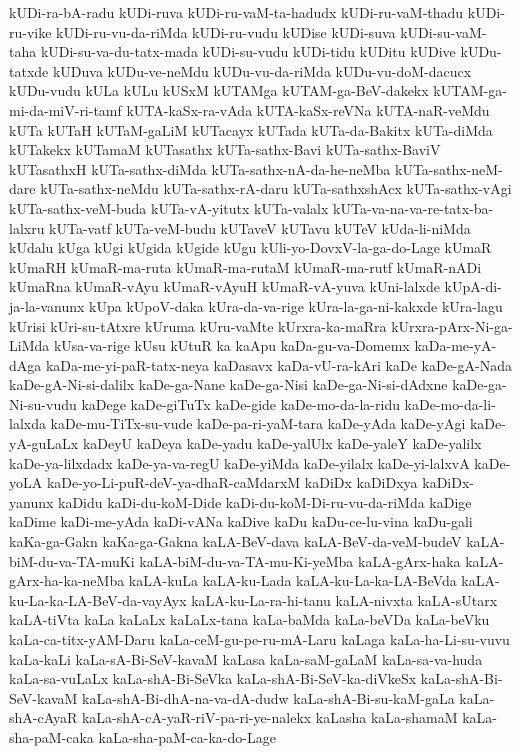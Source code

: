 {kUDi-ra-bA-radu
kUDi-ruva
kUDi-ru-vaM-ta-hadudx
kUDi-ru-vaM-thadu
kUDi-ru-vike
kUDi-ru-vu-da-riMda
kUDi-ru-vudu
kUDise
kUDi-suva
kUDi-su-vaM-taha
kUDi-su-va-du-tatx-mada
kUDi-su-vudu
kUDi-tidu
kUDitu
kUDive
kUDu-tatxde
kUDuva
kUDu-ve-neMdu
kUDu-vu-da-riMda
kUDu-vu-doM-dacucx
kUDu-vudu
kULa
kULu
kUSxM
kUTAMga
kUTAM-ga-BeV-dakekx
kUTAM-ga-mi-da-miV-ri-tamf
kUTA-kaSx-ra-vAda
kUTA-kaSx-reVNa
kUTA-naR-veMdu
kUTa
kUTaH
kUTaM-gaLiM
kUTacayx
kUTada
kUTa-da-Bakitx
kUTa-diMda
kUTakekx
kUTamaM
kUTasathx
kUTa-sathx-Bavi
kUTa-sathx-BaviV
kUTasathxH
kUTa-sathx-diMda
kUTa-sathx-nA-da-he-neMba
kUTa-sathx-neM-dare
kUTa-sathx-neMdu
kUTa-sathx-rA-daru
kUTa-sathxshAcx
kUTa-sathx-vAgi
kUTa-sathx-veM-buda
kUTa-vA-yitutx
kUTa-valalx
kUTa-va-na-va-re-tatx-ba-lalxru
kUTa-vatf
kUTa-veM-budu
kUTaveV
kUTavu
kUTeV
kUda-li-niMda
kUdalu
kUga
kUgi
kUgida
kUgide
kUgu
kUli-yo-DovxV-la-ga-do-Lage
kUmaR
kUmaRH
kUmaR-ma-ruta
kUmaR-ma-rutaM
kUmaR-ma-rutf
kUmaR-nADi
kUmaRna
kUmaR-vAyu
kUmaR-vAyuH
kUmaR-vA-yuva
kUni-lalxde
kUpA-di-ja-la-vanunx
kUpa
kUpoV-daka
kUra-da-va-rige
kUra-la-ga-ni-kakxde
kUra-lagu
kUrisi
kUri-su-tAtxre
kUruma
kUru-vaMte
kUrxra-ka-maRra
kUrxra-pArx-Ni-ga-LiMda
kUsa-va-rige
kUsu
kUtuR
ka
kaApu
kaDa-gu-va-Domemx
kaDa-me-yA-dAga
kaDa-me-yi-paR-tatx-neya
kaDasavx
kaDa-vU-ra-kAri
kaDe
kaDe-gA-Nada
kaDe-gA-Ni-si-dalilx
kaDe-ga-Nane
kaDe-ga-Nisi
kaDe-ga-Ni-si-dAdxne
kaDe-ga-Ni-su-vudu
kaDege
kaDe-giTuTx
kaDe-gide
kaDe-mo-da-la-ridu
kaDe-mo-da-li-lalxda
kaDe-mu-TiTx-su-vude
kaDe-pa-ri-yaM-tara
kaDe-yAda
kaDe-yAgi
kaDe-yA-guLaLx
kaDeyU
kaDeya
kaDe-yadu
kaDe-yalUlx
kaDe-yaleY
kaDe-yalilx
kaDe-ya-lilxdadx
kaDe-ya-va-regU
kaDe-yiMda
kaDe-yilalx
kaDe-yi-lalxvA
kaDe-yoLA
kaDe-yo-Li-puR-deV-ya-dhaR-caMdarxM
kaDiDx
kaDiDxya
kaDiDx-yanunx
kaDidu
kaDi-du-koM-Dide
kaDi-du-koM-Di-ru-vu-da-riMda
kaDige
kaDime
kaDi-me-yAda
kaDi-vANa
kaDive
kaDu
kaDu-ce-lu-vina
kaDu-gali
kaKa-ga-Gakn
kaKa-ga-Gakna
kaLA-BeV-dava
kaLA-BeV-da-veM-budeV
kaLA-biM-du-va-TA-muKi
kaLA-biM-du-va-TA-mu-Ki-yeMba
kaLA-gArx-haka
kaLA-gArx-ha-ka-neMba
kaLA-kuLa
kaLA-ku-Lada
kaLA-ku-La-ka-LA-BeVda
kaLA-ku-La-ka-LA-BeV-da-vayAyx
kaLA-ku-La-ra-hi-tanu
kaLA-nivxta
kaLA-sUtarx
kaLA-tiVta
kaLa
kaLaLx
kaLaLx-tana
kaLa-baMda
kaLa-beVDa
kaLa-beVku
kaLa-ca-titx-yAM-Daru
kaLa-ceM-gu-pe-ru-mA-Laru
kaLaga
kaLa-ha-Li-su-vuvu
kaLa-kaLi
kaLa-sA-Bi-SeV-kavaM
kaLasa
kaLa-saM-gaLaM
kaLa-sa-va-huda
kaLa-sa-vuLaLx
kaLa-shA-Bi-SeVka
kaLa-shA-Bi-SeV-ka-diVkeSx
kaLa-shA-Bi-SeV-kavaM
kaLa-shA-Bi-dhA-na-va-dA-dudw
kaLa-shA-Bi-su-kaM-gaLa
kaLa-shA-cAyaR
kaLa-shA-cA-yaR-riV-pa-ri-ye-nalekx
kaLasha
kaLa-shamaM
kaLa-sha-paM-caka
kaLa-sha-paM-ca-ka-do-Lage
}
